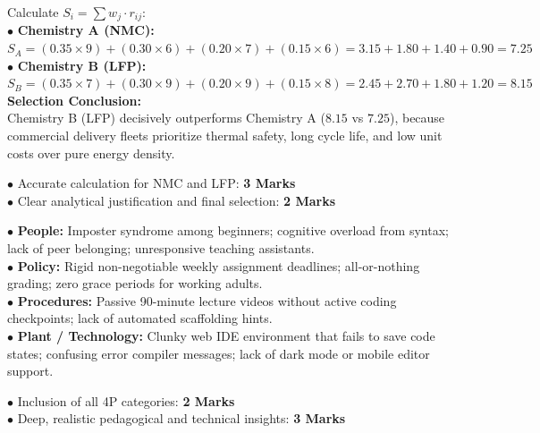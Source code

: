 \begin{solutionbox}
Calculate $S_i = \sum w_j \cdot r_{ij}$:\\
$\bullet$ \textbf{Chemistry A (NMC):}\\
$S_A = (0.35 \times 9) + (0.30 \times 6) + (0.20 \times 7) + (0.15 \times 6) = 3.15 + 1.80 + 1.40 + 0.90 = \mathbf{7.25}$\\
$\bullet$ \textbf{Chemistry B (LFP):}\\
$S_B = (0.35 \times 7) + (0.30 \times 9) + (0.20 \times 9) + (0.15 \times 8) = 2.45 + 2.70 + 1.80 + 1.20 = \mathbf{8.15}$\\
\textbf{Selection Conclusion:}\\
Chemistry B (LFP) decisively outperforms Chemistry A ($8.15$ vs $7.25$), because commercial delivery fleets prioritize thermal safety, long cycle life, and low unit costs over pure energy density.
\begin{markingrubric}
$\bullet$ Accurate calculation for NMC and LFP: \textbf{3 Marks}\\
$\bullet$ Clear analytical justification and final selection: \textbf{2 Marks}
\end{markingrubric}
\end{solutionbox}

\begin{solutionbox}
$\bullet$ \textbf{People:} Imposter syndrome among beginners; cognitive overload from syntax; lack of peer belonging; unresponsive teaching assistants.\\
$\bullet$ \textbf{Policy:} Rigid non-negotiable weekly assignment deadlines; all-or-nothing grading; zero grace periods for working adults.\\
$\bullet$ \textbf{Procedures:} Passive 90-minute lecture videos without active coding checkpoints; lack of automated scaffolding hints.\\
$\bullet$ \textbf{Plant / Technology:} Clunky web IDE environment that fails to save code states; confusing error compiler messages; lack of dark mode or mobile editor support.
\begin{markingrubric}
$\bullet$ Inclusion of all 4P categories: \textbf{2 Marks}\\
$\bullet$ Deep, realistic pedagogical and technical insights: \textbf{3 Marks}
\end{markingrubric}
\end{solutionbox}

